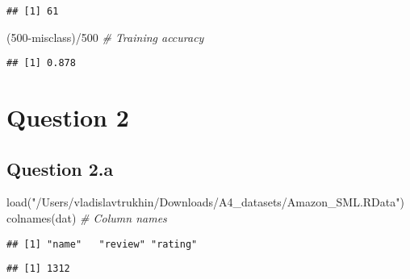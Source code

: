 \documentclass[
]{article}
\newenvironment{Shaded}{\begin{snugshade}}{\end{snugshade}}
\newcommand{\CommentTok}[1]{\textcolor[rgb]{0.56,0.35,0.01}{\textit{#1}}}
\newcommand{\DecValTok}[1]{\textcolor[rgb]{0.00,0.00,0.81}{#1}}
\newcommand{\FunctionTok}[1]{\textcolor[rgb]{0.00,0.00,0.00}{#1}}
\newcommand{\NormalTok}[1]{#1}
\newcommand{\SpecialCharTok}[1]{\textcolor[rgb]{0.00,0.00,0.00}{#1}}
\newcommand{\StringTok}[1]{\textcolor[rgb]{0.31,0.60,0.02}{#1}}
\begin{document}
\begin{verbatim}
## [1] 61
\end{verbatim}

\begin{Shaded}
\begin{Highlighting}[]
\NormalTok{(}\DecValTok{500}\SpecialCharTok{{-}}\NormalTok{misclass)}\SpecialCharTok{/}\DecValTok{500} \CommentTok{\# Training accuracy}
\end{Highlighting}
\end{Shaded}

\begin{verbatim}
## [1] 0.878
\end{verbatim}

\hypertarget{question-2}{%
\section{Question 2}\label{question-2}}

\hypertarget{question-2.a}{%
\subsection{Question 2.a}\label{question-2.a}}

\begin{Shaded}
\begin{Highlighting}[]
\FunctionTok{load}\NormalTok{(}\StringTok{"/Users/vladislavtrukhin/Downloads/A4\_datasets/Amazon\_SML.RData"}\NormalTok{)}
\FunctionTok{colnames}\NormalTok{(dat) }\CommentTok{\# Column names}
\end{Highlighting}
\end{Shaded}

\begin{verbatim}
## [1] "name"   "review" "rating"
\end{verbatim}

\begin{Shaded}
\end{Shaded}

\begin{verbatim}
## [1] 1312
\end{verbatim}

\begin{Shaded}
\end{Shaded}
\end{document}

